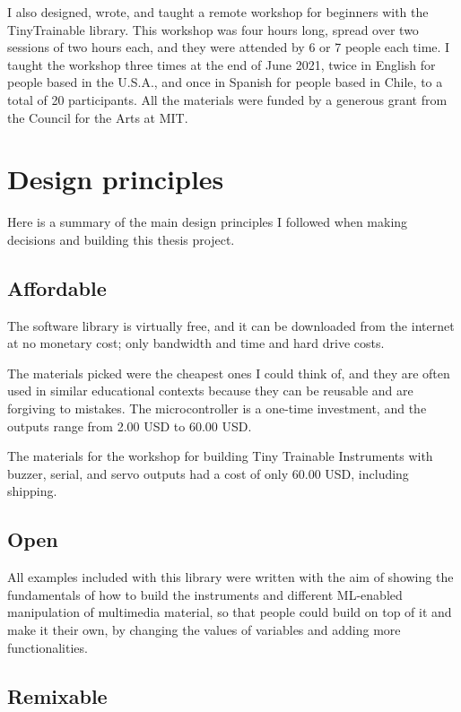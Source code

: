 I also designed, wrote, and taught a remote workshop for beginners with the TinyTrainable library. This workshop was four hours long, spread over two sessions of two hours each, and they were attended by 6 or 7 people each time. I taught the workshop three times at the end of June 2021, twice in English for people based in the U.S.A., and once in Spanish for people based in Chile, to a total of 20 participants. All the materials were funded by a generous grant from the Council for the Arts at MIT.

\section{Design principles}

Here is a summary of the main design principles I followed when making decisions and building this thesis project.

\subsection{Affordable}

The software library is virtually free, and it can be downloaded from the internet at no monetary cost; only bandwidth and time and hard drive costs.

The materials picked were the cheapest ones I could think of, and they are often used in similar educational contexts because they can be reusable and are forgiving to mistakes. The microcontroller is a one-time investment, and the outputs range from 2.00 USD to 60.00 USD. 

The materials for the workshop for building Tiny Trainable Instruments with buzzer, serial, and servo outputs had a cost of only 60.00 USD, including shipping.

\subsection{Open}

All examples included with this library were written with the aim of showing the fundamentals of how to build the instruments and different \acrshort{ML}-enabled manipulation of multimedia material, so that people could build on top of it and make it their own, by changing the values of variables and adding more functionalities.

\subsection{Remixable}

